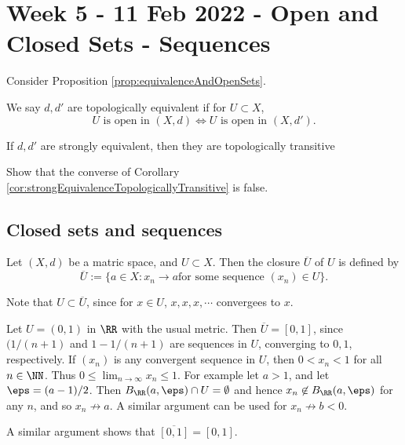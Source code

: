 \section{Week 5 - 11 Feb 2022 - Open and Closed Sets - Sequences}
Consider Proposition \ref{prop:equivalenceAndOpenSets}.
\begin{definition}
  We say $d,d'$ are topologically equivalent if for $U\subset X$,
  \[ U \text{ is open in } (X,d) \iff U \text{ is open in } (X,d').\]
  \label{<+label+>}
\end{definition}
\begin{corollary}
  If $d,d'$ are strongly equivalent, then they are topologically transitive
  \label{cor:strongEquivalenceTopologicallyTransitive}
\end{corollary}
\begin{exercise}
  Show that the converse of Corollary
  \ref{cor:strongEquivalenceTopologicallyTransitive} is false.
\end{exercise}

\subsection{Closed sets and sequences}
\begin{definition}
  Let $(X,d)$ be a matric space, and $U\subset X$. Then the closure
  $\overline{U}$ of $U$ is defined by
  \[\overline{U}:= \{ a\in X: x_n\to a \text{for some sequence }(x_n) \in U \}.\]
  \label{<+label+>}
\end{definition}
Note that $U\subset \overline{U}$, since for $x\in U$, $x,x,x,\cdots$ convergees
to $x$.
\begin{example}
  Let $U=(0,1)$ in $\RR$ with the usual metric. Then $\overline{U}=[0,1]$, since
  $(1/(n+1)$ and $1-1/(n+1)$ are sequences in $U$, converging to $0, 1$,
    respectively. If $(x_n)$ is any convergent sequence in $U$, then $0<x_n<1$
    for all $n\in\NN$. Thus $0\leq \lim_{n\to\infty} x_n\leq 1$. For example let
  $a>1$, and let $\eps=(a-1)/2$. Then $B_{\RR}(a,\eps)\cap U =\emptyset$ and
  hence $x_n\not\in B_{\RR}(a,\eps)$ for any $n$, and so $x_n\not\to a$. A
  similar argument can be used for $x_n\not\to b<0$.

  A similar argument shows that $\overline{[0,1]}=[0,1]$.
\end{example}

